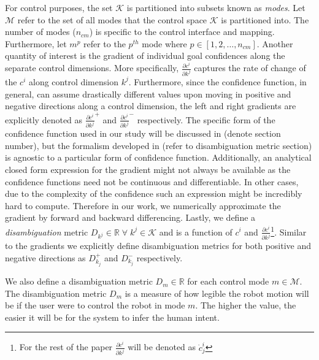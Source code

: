 \documentclass[conference]{IEEEtran}
\begin{document}
For control purposes, the set $\mathcal{K}$ is partitioned into subsets known as \textit{modes}. Let $\mathcal{M}$ refer to the set of all modes that the control space $\mathcal{K}$ is partitioned into. The number of modes ($n_{cm}$) is specific to the control interface and mapping. Furthermore, let $m^{p}$ refer to the $p^{th}$ mode where $p \in [1,2,\dots,n_{cm}]$.
Another quantity of interest is the gradient of individual goal confidences along the separate control dimensions. More specifically, $\frac{\partial c^i}{\partial k^j}$ captures the rate of change of the $c^{i}$ along control dimension $k^{j}$. Furthermore, since the confidence function, in general, can assume drastically different values upon moving in positive and negative directions along a control dimension, the left and right gradients are explicitly denoted as $\frac{\partial c^i}{\partial k^j}^{+}$ and $\frac{\partial c^i}{\partial k^j}^{-}$ respectively. The specific form of the confidence function used in our study will be discussed in (denote section number), but the formalism developed in (refer to disambiguation metric section) is agnostic to a particular form of confidence function. Additionally, an analytical closed form expression for the gradient might not always be available as the confidence functions need not be continuous and differentiable. In other cases, due to the complexity of the confidence such an expression might be incredibly hard to compute. Therefore in our work, we numerically approximate the gradient by forward and backward differencing. 
Lastly, we define a \textit{disambiguation} metric  $D_{k^j}\in \mathbb{R}\; \forall \;k^j \in \mathcal{K}$ and is a function of $c^i$ and $\frac{\partial c^i}{\partial k^j}$\footnote{For the rest of the paper $\frac{\partial c^i}{\partial k^j}$ will be denoted as $ \dot{c}^{i}_j$}. Similar to the gradients we explicitly define disambiguation metrics for both positive and negative directions as $D_{k_j}^{+}$ and $D_{k_j}^{-}$ respectively.

We also define a disambiguation metric $D_m \in \mathbb{R}$ for each control mode $m \in \mathcal{M}$.
The disambiguation metric $D_m$ is a measure of how legible the robot motion will be if the user were to control the robot in mode $m$. The higher the value, the easier it will be for the system to infer the human intent. 
\end{document}
